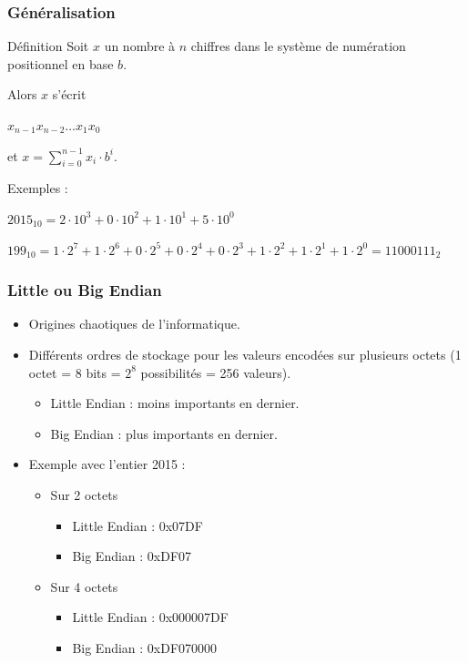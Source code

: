 	\frame
	{
		\frametitle{G\'en\'eralisation}
		\begin{block}{D\'efinition}
			Soit $x$ un nombre \`a $n$ chiffres dans le syst\`eme de num\'eration positionnel en base $b$.
			
			Alors $x$ s'\'ecrit
			
			$x_{n-1}x_{n-2}\ldots x_1x_0$
			
			et $x=\sum\limits_{i = 0}^{n-1}x_i\cdot b^i$.
		\end{block}
		
		Exemples :
		\begin{description}
			\item $2015_{10} = 2\cdot10^3 + 0\cdot10^2 + 1\cdot10^1+5\cdot10^0$
			\item $199_{10} = 1\cdot2^7 + 1\cdot2^6 + 0\cdot2^5+0\cdot2^4 + 0\cdot2^3 + 1\cdot2^2 + 1\cdot2^1+1\cdot2^0 = 11000111_2$
		\end{description}
	}

\frame
{
	\frametitle{Little ou Big Endian}
	\begin{itemize}
		\item Origines chaotiques de l'informatique.
		\item Diff\'erents ordres de stockage pour les valeurs encod\'ees sur plusieurs octets (1 octet = 8 bits = $2^8$ possibilit\'es = 256 valeurs).
		\begin{itemize}
			\item Little Endian : moins importants en dernier.
			\item Big Endian : plus importants en dernier.
		\end{itemize}
		\item Exemple avec l'entier 2015 :
		\begin{itemize}
			\item Sur 2 octets
			\begin{itemize}
				\item Little Endian : 0x07DF
				\item Big Endian : 0xDF07
			\end{itemize}
			\item Sur 4 octets
			\begin{itemize}
				\item Little Endian : 0x000007DF
				\item Big Endian : 0xDF070000
			\end{itemize}
		\end{itemize}
	\end{itemize}
}

